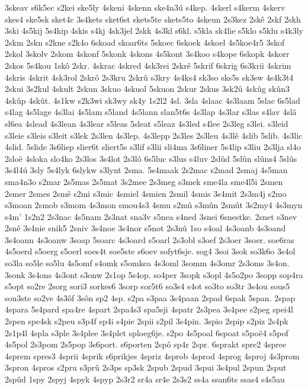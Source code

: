 {3skeav
s6k5ec
s2kei
ske5ly
4skeni
4skenn
ske4n3ú
s4kep.
4skerl
s4kerm
4skerv
skes4
ske5sk
sket4c
3s4kets
sket6st
skets5te
skets5to
4skeun
2s3kez
2skê
2skf
2skh
3ski
4s5kij
5s4kip
4skis
s4kj
4sk3jel
2skk
4s3kl
s6kl.
s5kla
sk4lie
s5klo
s5klu
s4k3ly
2skm
2skn
s2kne
s2k4o
6skoad
skoar6ts
5skoec
6skoek
4skoel
4s5koe4r5
3skof
2skol
3skolv
2skom
4skonf
5skonk
4skons
4s5kont
3s4koo
s4kope
6skopk
4skorr
2skos
5s4kou
1skô
2skr.
4skrac
4skred
4sk3rei
2skrê
5skrif
6skrig
6s3krii
4skrim
4skris
4skrit
4sk3rol
2skrô
2s3kru
2skrû
s3kry
4s4ks4
sk3so
sks5s
sk3sw
4s4k3t4
2skui
3s2kul
4skult
2skun
3skuo
4skuol
5skuon
2skur
2skus
3sk2û
4skûg
skûn3
4skûp
4skût.
4s1kw
s2k3wi
sk3wy
sk4y
1s2l2
4sl.
3sla
4slaac
4s3laam
5slac
6s5lad
s4lag
4s5lage
4s3lai
4s5lam
s5land
4s5lann
slan5t6s
4s3lap
4s3lar
s3las
s4lav
4slâ
sl6ea
4slead
4s3lean
4s3lear
s5leas
5sleat
s5leaz
4s3led
s4lee
2s3leg
s3lei.
s3leid
s3leie
s3leis
s3leit
s3lek
2s3len
4s3lep.
4s3lepp
2s3les
2s3leu
4s3lê
4slib
5slib.
4s3lic
4slid.
5slide
3s6liep
slier6t
sliert5s
s3lif
s3lii
sli4ma
3s6liner
5s4lip
s3liu
2s3lja
sl4o
2sloë
4sloka
slo4ko
2s3los
3s4lot
2s3lô
6s5luc
s3lus
s4luv
2slûd
5slûn
slûns4
5slûs
3s4l4ú
3sly
5s4lyk
6slykw
s3lynt
2sma.
5s4maak
2s2mac
s2mad
2smaj
4s5man
sma4n3o
s2mar
2s5mas
2s5mat
3s2mee
2s3meg
s3mek
sme4la
sme4l5i
2smen
2smer
2smes
2smê
s2mi
s3mic
4smiel
4smien
2smil
4smis
3s4mit
2s3m4j
s2mo
s3moan
2smob
s3mom
4s3mon
smou4s3
4smu
s2mû
s3mûn
2smût
3s2my4
4s3myn
s4m'
1s2n2
2s3nac
4s5nam
2s3nat
sna3v
s5nea
s4ned
3snei
6snestke.
2snet
s3nev
2snê
3s4nie
snik5
2sniv
3s4noe
3s4nor
s5not
2s3nû
1so
s4oal
4s3oanb
4s3oand
3s4oann
4s3oanw
3soap
5soarc
4s3oard
s5oarl
2s3obl
s3oef
2s3oer
3soer.
soe6ras
4s5oerd
s5oerg
s5oerl
soes4t
soe5ste
s6oev
sofyt6sje.
sog4
3soi
3sok
so3k6o
3s4ol
so3la
so5le
so5lu
4s5omf
s4omk
s5omkea
4s3oml
3somm
4s3omr
2s3oms
3s4on.
3sonk
3s4ons
4s3ont
s3onw
2s1op
5s4op.
so4per
3sopk
s3opl
4s5o2po
3sopp
sop4ra
s5opt
so2re
2sorg
sori3
sorkes6
3sorp
sor5t6
so3s4
s4ot
so3to
so3tr
3s4ou
sous5
sou3ste
so2ve
4s3ôf
3sôn
sp2
4sp.
s2pa
s3paa
3s4paan
2spad
6spak
5span.
2spap
4spara
5s4pard
spa4re
4spart
2spa4s3
spa5sji
4spatr
2s3pea
3s4pee
s2peg
spei4l
2spen
spe4sk
s2peu
s3p4f
sp4i
s4pie
2spii
s2pil
3s4pin.
3spio
2spip
s2piz
2s4pk
2s1p4l
4spla
s3ple
3s4plee
3s4plet
sploeg6je.
s2po
4s5poal
6spoat
s5poë4
s5pof
4s5pol
2s3pom
2s5pop
3s6port.
s6porten
2spô
sp4r
2spr.
6sprakt
spre2
4spree
4sprem
spres3
4sprii
4sprik
s6prikjes
4spriz
4sprob
4sprod
4sprog
4sproj
4s3prom
3spron
4spros
s2pru
s3prû
2s3ps
sp3sk
2spub
2spud
3spui
3s4pul
2spun
2sput
2spûd
1spy
2spyj
4spyk
4spyp
2s3r2
sr4a
sr4e
2s3s2
ss4a
ssan6ts
ssas4
s4s5au
}

